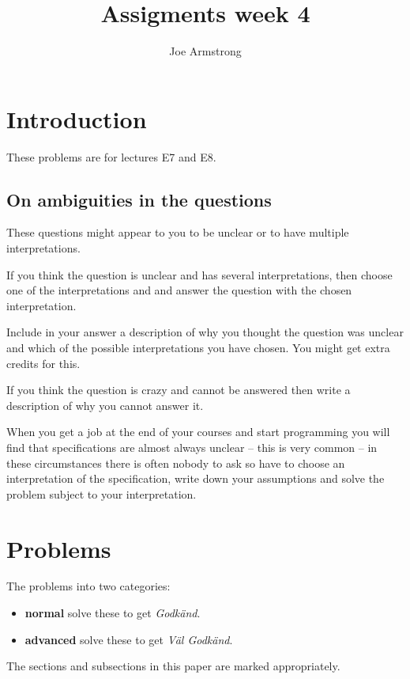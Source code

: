\documentclass[12pt]{hitec}
\title{Assigments week 4}
\author{Joe Armstrong}
\begin{document}
\maketitle

\tableofcontents

\section{Introduction}
These problems are for lectures E7 and E8.

\subsection*{On ambiguities in the questions}

These questions might appear to you to be unclear or to have multiple
interpretations.

If you think the question is unclear and has several interpretations,
then choose one of the interpretations and and answer the question
with the chosen interpretation.

Include in your answer a description of why you thought the question
was unclear and which of the possible interpretations you have
chosen. You might get extra credits for this.

If you think the question is crazy and cannot be answered then write a
description of why you cannot answer it.

When you get a job at the end of your courses and start programming
you will find that specifications are almost always unclear -- this is very
common -- in these circumstances there is often nobody to ask so have
to choose an interpretation of the specification, write down your
assumptions and solve the problem subject to your interpretation.
 


\section{Problems}

The problems into two categories:

\begin{itemize}
\item {\bf normal} solve these to get {\sl Godk\"{a}nd}.
\item {\bf advanced} solve these to get {\sl V\"{a}l Godk\"{a}nd}.
\end{itemize}

The sections and subsections in this paper are marked appropriately.
\end{document}
